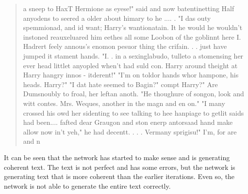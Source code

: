 \documentclass[11pt]{article}
\begin{document}
\begin{quote}
\raggedright
\ttfamily\normalsize
a sneep to HaxT Hermione as eyese!" said and now batentinetting Half anyodens to seered a older about himary to he
.... .  "I das outy spemmionad, and id want; Harry's wantionatain.  It he would he wouldn't instoned reauxeluared him eethes all some Loobon of the goblinnt here I.  Hadrert feely annous's enomon pesuor thing the crifain. . . just have jumped it stament hands.
"I. . in a sexinglabudo, tulleto a stomensing her ever head littlet anyopled when't had suld con. Harry around theight at Harry hangry innos - itderent!"
"I'm on toldor hands whor hampone, his heads.
Harry?"  "I dat hate seemed to Bagin?"  compt Harry?" Are Dumsnoubly to froal, her leftan anoth.
"He thoughure of songon, look and witt contes.  Mrs.
Weques, another in the magn and en on."
"I many crossed his owd her sidenting to see talking to hee hanpiage to getlit saids had been.... fafted dear Graugon and ston enerp antorsaad hand make allow now in't yeh," he had decentt. . . . Vermany sprigisu!"  I'm, for are and n
\end{quote}

It can be seen that the network has started to make sense and is generating coherent text. 
The text is not perfect and has some errors, but the network is generating text that is more coherent than the earlier iterations.
Even so, the network is not able to generate the entire text correctly.
\end{document}
